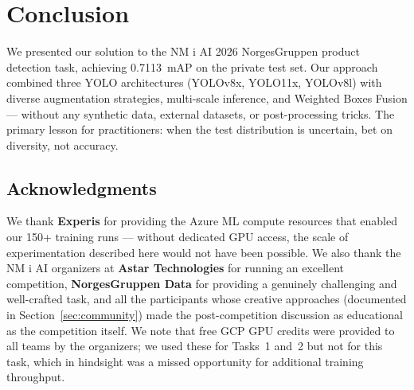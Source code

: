 \documentclass[11pt,a4paper]{article}
\begin{document}
\section{Conclusion}
\label{sec:conclusion}

We presented our solution to the NM i AI 2026 NorgesGruppen product detection task, achieving 0.7113~mAP on the private test set.
Our approach combined three YOLO architectures (YOLOv8x, YOLO11x, YOLOv8l) with diverse augmentation strategies, multi-scale inference, and Weighted Boxes Fusion --- without any synthetic data, external datasets, or post-processing tricks.
The primary lesson for practitioners: when the test distribution is uncertain, bet on diversity, not accuracy.

\subsection*{Acknowledgments}

We thank \textbf{Experis} for providing the Azure ML compute resources that enabled our 150+ training runs --- without dedicated GPU access, the scale of experimentation described here would not have been possible.
We also thank the NM i AI organizers at \textbf{Astar Technologies} for running an excellent competition, \textbf{NorgesGruppen Data} for providing a genuinely challenging and well-crafted task, and all the participants whose creative approaches (documented in Section~\ref{sec:community}) made the post-competition discussion as educational as the competition itself.
We note that free GCP GPU credits were provided to all teams by the organizers; we used these for Tasks~1 and~2 but not for this task, which in hindsight was a missed opportunity for additional training throughput.
\end{document}
